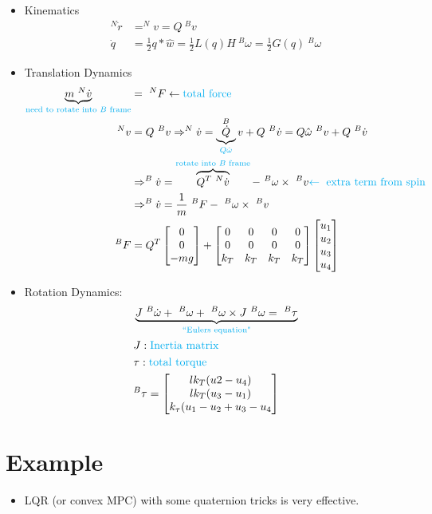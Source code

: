 \documentclass[11pt]{article}
\begin{document}
\begin{itemize}
    \item Kinematics
    \begin{align*}
        ^N\dot{r} &= ^Nv = Q \ ^Bv \\
        \dot{q} &= \frac{1}{2}q*\hat{w} = \frac{1}{2}L(q)H \ ^B\omega = \frac{1}{2}G(q)\ ^B\omega
    \end{align*}
    \item Translation Dynamics 
    \begin{align*}
        \underbrace{m \ ^N\dot{v}}_{\textcolor{cyan}{\text{need to rotate into }B \text{ frame}}} &= \ ^NF \leftarrow \textcolor{cyan}{\text{total force}}
        \\
        ^Nv &= Q \ ^Bv \Rightarrow ^N\dot{v} = \underbrace{\dot{Q}}_{\textcolor{cyan}{Q\hat{\omega}}} ^Bv + Q\ ^B\dot{v} = Q\hat{\omega} \ ^Bv + Q \ ^B\dot{v} \\
        &\Rightarrow ^B\dot{v} = \overbrace{Q^T\ ^N\dot{v}}^{\textcolor{cyan}{\text{rotate into }B\text{ frame}}} - \ ^B\omega\times \ ^Bv \textcolor{cyan}{\leftarrow \text{ extra term from spin}} \\
        & \Rightarrow ^B\dot{v} = \frac{1}{m} \ ^BF - \ ^B\omega\times \ ^Bv \\
        ^BF &= Q^T\begin{bmatrix}
            0 \\
            0 \\
            -mg
        \end{bmatrix}
        +
        \begin{bmatrix}
            0 & 0 & 0 & 0 \\
            0 & 0 & 0 & 0 \\
            k_T & k_T & k_T & k_T
        \end{bmatrix}
        \begin{bmatrix}
            u_1 \\
            u_2 \\
            u_3 \\
            u_4
        \end{bmatrix}
    \end{align*}
    \item Rotation Dynamics:
    \begin{align*}
        &\underbrace{J \ ^B\dot{\omega} + \ ^ B\omega + \ ^ B\omega\times J \ ^B\omega = \ ^B\tau}_{\textcolor{cyan}{\text{``Eulers equation"}}}
        \\
        &J: \textcolor{cyan}{\text{Inertia matrix}}
        \\
        &\tau :\textcolor{cyan}{\text{total torque}}
        \\
        & ^B\tau = \begin{bmatrix}
            l k_T(u2-u_4) \\
            lk_T(u_3-u_1) \\
            k_\tau(u_1-u_2 + u_3-u_4
        \end{bmatrix}
    \end{align*}
\end{itemize}

\section{Example}
\begin{itemize}
    \item LQR (or convex MPC) with some quaternion tricks is very effective.
\end{itemize}
\end{document}
